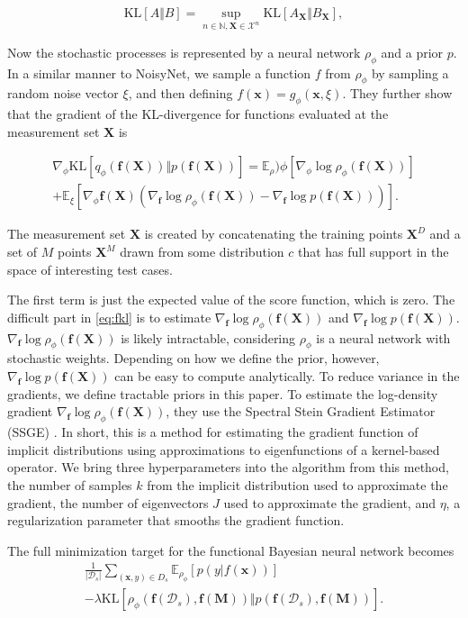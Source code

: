 \documentclass[]{uai2021} %
\newcommand{\E}{\mathbb{E}}
\newcommand{\N}{\mathbb{N}}
\newcommand{\D}{\mathcal{D}}
\newcommand{\X}{\mathbf{X}}
\newcommand{\f}{\mathbf{f}}
\newcommand{\KL}{\mathrm{KL}}
\begin{document}
\begin{equation}
    \KL[A \Vert B] = \sup_{n \in \N, \X \in \mathcal{X}^n} \KL \left[ A_\X \Vert B_\X \right],
\end{equation}

Now the stochastic processes is represented by a neural network \(\rho_\phi\) and a prior \(p\). In a similar
manner to NoisyNet, we sample a function \(f\) from \(\rho_\phi\) by sampling a random noise vector
\(\xi\), and then defining \(f(\bm{x}) = g_\phi(\bm{x}, \xi)\). They further show that the
gradient of the KL-divergence for functions evaluated at the measurement set \(\X\) is

\begin{multline}\label{eq:fkl}
    \nabla_\phi \KL[q_\phi(\f(\X)) \Vert p(\f(\X))] = \E_\rho)\phi \left[ \nabla_\phi \log \rho_\phi (\f(\X)) \right]\\
    + \E_\xi \left[ \nabla_\phi \f(\X)( \nabla_\f \log \rho_\phi(\f(\X)) - \nabla_\f \log p(\f(\X))) \right].
\end{multline}

The measurement set \(\X\) is created by concatenating the training points \(\X^D\) and a
set of \(M\) points \(\X^M\) drawn from some distribution \(c\) that has full support
in the space of interesting test cases. 

The first term is just the expected value of the score function, which is zero.
The difficult part in \eqref{eq:fkl} is to estimate \(\nabla_\f \log \rho_\phi(\f(\X))\)
and \(\nabla_\f \log p(\f(\X))\). \(\nabla_\f \log \rho_\phi(\f(\X))\) is likely 
intractable, considering \(\rho_\phi\) is a neural network with stochastic weights.
Depending on how we define the prior, however, \(\nabla_\f \log p(\f(\X))\)
can be easy to compute analytically. To reduce variance in the gradients, we
define tractable priors in this paper. To estimate the log-density gradient
\(\nabla_\f \log \rho_\phi(\f(\X))\), they use the Spectral Stein Gradient Estimator (SSGE)
\citep{shi_spectral_2018}. In short, this is a method for estimating the gradient
function of implicit distributions using approximations to eigenfunctions of a 
kernel-based operator. We bring three hyperparameters into the algorithm from this
method, the number of samples \(k\) from the implicit distribution used to approximate
the gradient, the number of eigenvectors \(J\) used to approximate the gradient, and
\(\eta\), a regularization parameter that smooths the gradient function.

The full minimization target for the functional Bayesian neural network becomes
\begin{multline}
    {\frac{1}{\lvert \D_s \rvert}} \sum_{(\bm{x}, y) \in D_s} \E_{\rho_\phi}
    \left[ p(y \vert f(\bm{x})) \right]\\ - \lambda \KL
    \left[ \rho_\phi \left(\f(\D_s), \f(\mathbf{M}) \right) \Vert p \left(\f(\D_s), \f(\mathbf{M}) \right) \right].
\end{multline}
\end{document}
